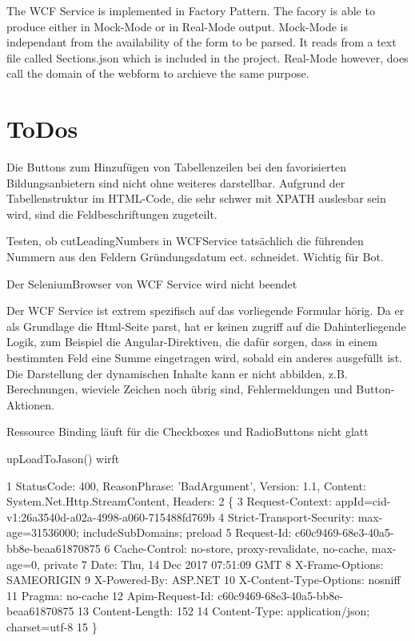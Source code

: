 The W\+CF Service is implemented in Factory Pattern. The facory is able to produce either in Mock-\/\+Mode or in Real-\/\+Mode output. Mock-\/\+Mode is independant from the availability of the form to be parsed. It reads from a text file called Sections.\+json which is included in the project. Real-\/\+Mode however, does call the domain of the webform to archieve the same purpose.\hypertarget{index_third}{}\section{To\+Dos}\label{index_third}

\begin{DoxyItemize}
\item Die Buttons zum Hinzufügen von Tabellenzeilen bei den favorisierten Bildungsanbietern sind nicht ohne weiteres darstellbar. Aufgrund der Tabellenstruktur im H\+T\+M\+L-\/\+Code, die sehr schwer mit X\+P\+A\+TH auslesbar sein wird, sind die Feldbeschriftungen zugeteilt.
\item Testen, ob cut\+Leading\+Numbers in W\+C\+F\+Service tatsächlich die führenden Nummern aus den Feldern Gründungsdatum ect. schneidet. Wichtig für Bot.
\item Der Selenium\+Browser von W\+CF Service wird nicht beendet
\item Der W\+CF Service ist extrem spezifisch auf das vorliegende Formular hörig. Da er als Grundlage die Html-\/\+Seite parst, hat er keinen zugriff auf die Dahinterliegende Logik, zum Beispiel die Angular-\/\+Direktiven, die dafür sorgen, dass in einem bestimmten Feld eine Summe eingetragen wird, sobald ein anderes ausgefüllt ist. Die Darstellung der dynamischen Inhalte kann er nicht abbilden, z.\+B. Berechnungen, wieviele Zeichen noch übrig sind, Fehlermeldungen und Button-\/\+Aktionen.
\item Ressource Binding läuft für die Checkboxes und Radio\+Buttons nicht glatt
\item up\+Load\+To\+Jason() wirft
\end{DoxyItemize}


\begin{DoxyCode}
1 StatusCode: 400, ReasonPhrase: 'BadArgument', Version: 1.1, Content: System.Net.Http.StreamContent,
       Headers:
2 \{
3   Request-Context: appId=cid-v1:26a3540d-a02a-4998-a060-715488fd769b
4   Strict-Transport-Security: max-age=31536000; includeSubDomains; preload
5   Request-Id: c60c9469-68e3-40a5-bb8e-beaa61870875
6   Cache-Control: no-store, proxy-revalidate, no-cache, max-age=0, private
7   Date: Thu, 14 Dec 2017 07:51:09 GMT
8   X-Frame-Options: SAMEORIGIN
9   X-Powered-By: ASP.NET
10   X-Content-Type-Options: nosniff
11   Pragma: no-cache
12   Apim-Request-Id: c60c9469-68e3-40a5-bb8e-beaa61870875
13   Content-Length: 152
14   Content-Type: application/json; charset=utf-8
15 \}
\end{DoxyCode}



